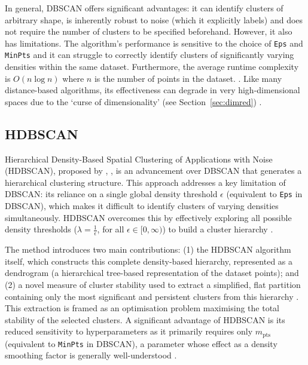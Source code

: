 \documentclass[10pt,oneside]{report}
\renewcommand{\citet}[1]{\citeauthor{#1}, \citeyear{#1}}
\begin{document}
In general, DBSCAN offers significant advantages: it can identify clusters of arbitrary shape, is inherently robust to noise (which it explicitly labels) and does not require the number of clusters to be specified beforehand. However, it also has limitations. The algorithm's performance is sensitive to the choice of \texttt{Eps} and \texttt{MinPts} and it can struggle to correctly identify clusters of significantly varying densities within the same dataset. Furthermore, the average runtime complexity is $O(n\log n)$ where $n$ is the number of points in the dataset. \cite{ester1996density, campello2013density}. Like many distance-based algorithms, its effectiveness can degrade in very high-dimensional spaces due to the `curse of dimensionality' (see Section~\ref{sec:dimred}) \cite{hinneburg1999optimal, verleysen2005curse}.



\subsection{HDBSCAN}\label{sec:hdbscan}

Hierarchical Density-Based Spatial Clustering of Applications with Noise (HDBSCAN), proposed by \citet{campello2013density}, is an advancement over DBSCAN that generates a hierarchical clustering structure. This approach addresses a key limitation of DBSCAN: its reliance on a single global density threshold $\epsilon$ (equivalent to \texttt{Eps} in DBSCAN), which makes it difficult to identify clusters of varying densities simultaneously. HDBSCAN overcomes this by effectively exploring all possible density thresholds ($\lambda = \frac 1 \epsilon$, for all $\epsilon \in \big[0, \infty \big)$) to build a cluster hierarchy \cite{campello2013density}.

The method introduces two main contributions: (1) the HDBSCAN algorithm itself, which constructs this complete density-based hierarchy, represented as a dendrogram (a hierarchical tree-based representation of the dataset points); and (2) a novel measure of cluster stability used to extract a simplified, flat partition containing only the most significant and persistent clusters from this hierarchy \cite{campello2013density}. This extraction is framed as an optimisation problem maximising the total stability of the selected clusters. A significant advantage of HDBSCAN is its reduced sensitivity to hyperparameters as it primarily requires only $m_{\text{pts}}$ (equivalent to \texttt{MinPts} in DBSCAN), a parameter whose effect as a density smoothing factor is generally well-understood \cite{campello2013density}.
\end{document}
